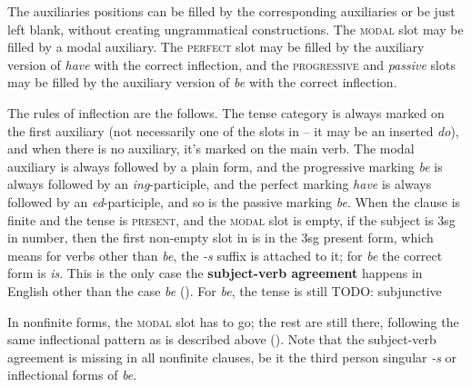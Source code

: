 \documentclass[UTF8, a4paper, oneside, scheme=plain]{ctexrep}
\newcommand*{\concept}[1]{\textbf{#1}}
\newcommand{\corpus}[1]{\emph{#1}}
\newcommand{\category}[1]{\textsc{#1}}
\begin{document}
The auxiliaries positions can be filled by the corresponding auxiliaries or be just left blank,
without creating ungrammatical constructions.
The \category{modal} slot may be filled by a modal auxiliary.
The \category{perfect} slot may be filled by the auxiliary version of \corpus{have} with the correct inflection,
and the \category{progressive} and \corpus{passive} slots 
may be filled by the auxiliary version of \corpus{be} with the correct inflection.

The rules of inflection are the follows.
The tense category is always marked on the first auxiliary
(not necessarily one of the slots in 
-- it may be an inserted \corpus{do}),
and when there is no auxiliary,
it's marked on the main verb.
The modal auxiliary is always followed by a plain form,
and the progressive marking \corpus{be} is always followed by an \corpus{ing}-participle,
and the perfect marking \corpus{have} is always followed by an \corpus{ed}-participle,
and so is the passive marking \corpus{be}.
When the clause is finite and the tense is \category{present},
and the \category{modal} slot is empty,
if the subject is 3sg in number,
then the first non-empty slot in 
is in the 3sg present form,
which means for verbs other than \corpus{be}, the \corpus{-s} suffix is attached to it;
for \corpus{be} the correct form is \corpus{is}.
This is the only case the \concept{subject-verb agreement} happens in English 
other than the case \corpus{be} ().
For \corpus{be}, the tense is still  TODO: subjunctive 

In nonfinite forms, the \category{modal} slot has to go;
the rest are still there, following the same inflectional pattern as is described above
().
Note that the subject-verb agreement is missing in all nonfinite clauses,
be it the third person singular \corpus{-s} or inflectional forms of \corpus{be}.
\end{document}
